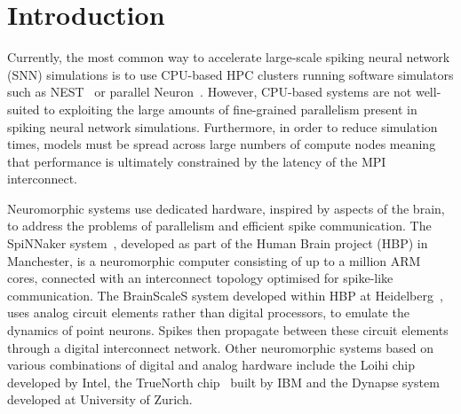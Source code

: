 \documentclass[utf8]{frontiersSCNS} %
\begin{document}
\section{Introduction}
Currently, the most common way to accelerate large-scale spiking neural network (SNN) simulations is to use CPU-based HPC clusters running software simulators such as NEST~\citep{Gewaltig2007} or parallel Neuron~\citep{carnevale2006neuron}.
However, CPU-based systems are not well-suited to exploiting the large amounts of fine-grained parallelism present in spiking neural network simulations.
Furthermore, in order to reduce simulation times, models must be spread across large numbers of compute nodes meaning that performance is ultimately constrained by the latency of the MPI interconnect.

Neuromorphic systems use dedicated hardware, inspired by aspects of the brain, to address the problems of parallelism and efficient spike communication.
The SpiNNaker system~\citep{Furber2014}, developed as part of the Human Brain project (HBP) in Manchester, is a neuromorphic computer consisting of up to a million ARM cores, connected with an interconnect topology optimised for spike-like communication.
The BrainScaleS system developed within HBP at Heidelberg~\citep{Schemmel2017}, uses analog circuit elements rather than digital processors, to emulate the dynamics of point neurons.
Spikes then propagate between these circuit elements through a digital interconnect network.
Other neuromorphic systems based on various combinations of digital and analog hardware include the Loihi chip~\citep{Davies2018} developed by Intel, the TrueNorth chip~\citep{Merolla2014} built by IBM and the Dynapse system~\cite{Qiao2015} developed at University of Zurich.
\end{document}

